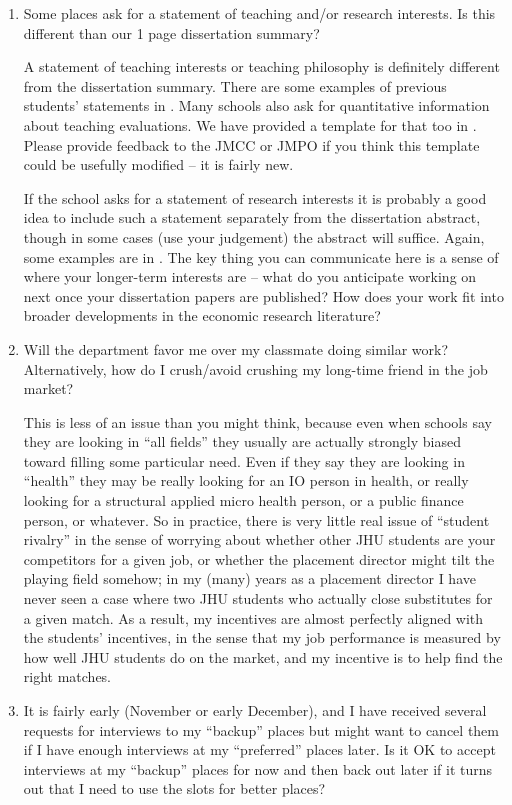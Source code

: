 \documentclass{econtex}
\begin{document}
\begin{enumerate}
\item Some places ask for a statement of teaching and/or research
  interests.  Is this different than our 1 page
  dissertation summary?

  A statement of teaching interests or teaching philosophy is
  definitely different from the dissertation summary.  There are some
  examples of previous students' statements in \Resources.  Many
  schools also ask for quantitative information about teaching
  evaluations.  We have provided a template for that too in
  \Templates.  Please provide feedback to the JMCC or JMPO if you
  think this template could be usefully modified -- it is fairly new.

If the school asks for a statement of research interests it is probably
a good idea to include such a statement separately from the dissertation
abstract, though in some cases (use your judgement) the abstract will suffice.  Again, some examples are in \Resources.  
The key thing you can communicate here is a sense of where your longer-term 
interests are -- what do you anticipate working on next once your dissertation
papers are published?  How does your work fit into broader developments in 
the economic research literature?

\item Will the department favor me over my classmate doing similar work?  Alternatively, how do I crush/avoid crushing my long-time friend in the job market?

  This is less of an issue than you might think, because even when schools say they are looking in ``all fields'' they usually are actually strongly biased toward filling some particular need.  Even if they say they are looking in ``health'' they may be really looking for an IO person in health, or really looking for a structural applied micro health person, or a public finance person, or whatever.  So in practice, there is very little real issue of ``student rivalry'' in the sense of worrying about whether other JHU students are your competitors for a given job, or whether the placement director might tilt the playing field somehow; in my (many) years as a placement director I have never seen a case where two JHU students who actually close substitutes for a given match.  As a result, my incentives are almost perfectly aligned with the students' incentives, in the sense that my job performance is measured by how well JHU students do on the market, and my incentive is to help find the right matches.

\item It is fairly early (November or early December), and I have received several requests for interviews to my ``backup'' places but might want to cancel them if I have enough interviews at my ``preferred'' places later.  Is it OK to accept interviews at my ``backup'' places for now and then back out later if it turns out that I need to use the slots for better places?


\end{enumerate}
\end{document}
